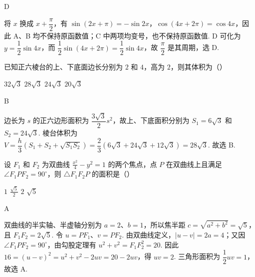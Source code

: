 \begin{answer}
D
\end{answer}

\begin{solution}
将 \(x\) 换成 \(x+\dfrac{\pi}{2}\)，有 \(\sin(2x+\pi)=-\sin2x\)，\(\cos(4x+2\pi)=\cos4x\)，因此 A、B 均不保持原函数值；C 中两项均变号，也不保持原函数值. D 可化为 \(y=\dfrac12\sin4x\)，而 \(\dfrac12\sin\left(4x+2\pi\right)=\dfrac12\sin4x\)，故 \(\dfrac{\pi}{2}\) 是其周期，选 D.
\end{solution}

\begin{problem}
已知正六棱台的上、下底面边长分别为 \(2\) 和 \(4\)，高为 \(2\)，则其体积为（\quad）

\choices
    {\(32\sqrt{3}\)}
    {\(28\sqrt{3}\)}
    {\(24\sqrt{3}\)}
    {\(20\sqrt{3}\)}
\end{problem}

\begin{answer}
B
\end{answer}

\begin{solution}
边长为 \(s\) 的正六边形面积为 \(\dfrac{3\sqrt3}{2}s^{2}\)，故上、下底面积分别为 \(S_1=6\sqrt3\) 和 \(S_2=24\sqrt3\). 棱台体积为
\(V=\dfrac{h}{3}\left(S_1+S_2+\sqrt{S_1S_2}\right)=\dfrac{2}{3}\left(6\sqrt3+24\sqrt3+12\sqrt3\right)=28\sqrt3\). 故选 B.
\end{solution}

\begin{problem}
设 \(F_{1}\) 和 \(F_{2}\) 为双曲线 \(\frac{x^{2}}{4} - y^{2} = 1\) 的两个焦点，点 \(P\) 在双曲线上且满足 \(\angle F_{1}PF_{2} = 90^{\circ}\)，则 \(\triangle F_{1}F_{2}P\) 的面积是（\quad）

\choices
    {\(1\)}
    {\(\frac{\sqrt{5}}{2}\)}
    {\(2\)}
    {\(\sqrt{5}\)}
\end{problem}

\begin{answer}
A
\end{answer}

\begin{solution}
双曲线的半实轴、半虚轴分别为 \(a=2\)、\(b=1\)，所以焦半距 \(c=\sqrt{a^{2}+b^{2}}=\sqrt5\)，且 \(F_1F_2=2\sqrt5\). 令 \(u=PF_1\)、\(v=PF_2\). 由双曲线定义，\(|u-v|=2a=4\)；又因 \(\angle F_1PF_2=90^{\circ}\)，由勾股定理有 \(u^{2}+v^{2}=F_1F_2^{2}=20\). 因此 \(16=(u-v)^2=u^2+v^2-2uv=20-2uv\)，得 \(uv=2\). 三角形面积为 \(\dfrac12uv=1\)，故选 A.
\end{solution}

